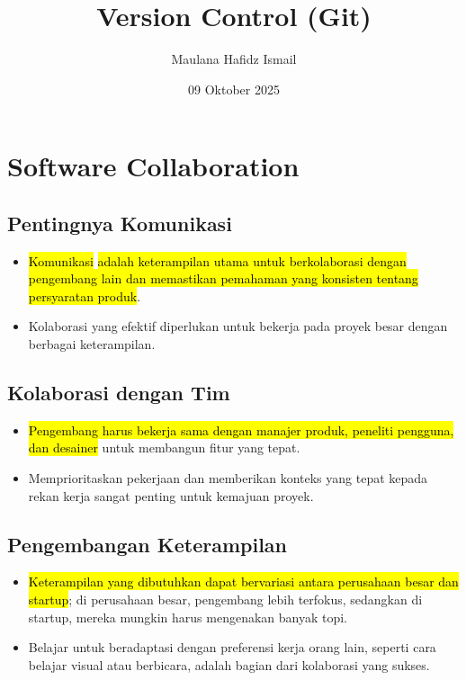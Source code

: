 \documentclass{article}
\title{Version Control (Git)}
\date{09 Oktober 2025}
\author{Maulana Hafidz Ismail}
\newcommand{\hlblue}[1]{\sethlcolor{cyan!30}\hl{#1}\sethlcolor{red!30}}
\begin{document}
\maketitle
\newpage

\tableofcontents
\newpage
{}

\section{Software Collaboration}
\subsection{Pentingnya Komunikasi}
\begin{itemize}
    \item \hlblue{Komunikasi} \hl{adalah keterampilan utama untuk berkolaborasi dengan pengembang lain dan memastikan pemahaman yang konsisten tentang persyaratan produk}.
    \item Kolaborasi yang efektif diperlukan untuk bekerja pada proyek besar dengan berbagai keterampilan.
\end{itemize}

\subsection{Kolaborasi dengan Tim}
\begin{itemize}
    \item \hl{Pengembang harus bekerja sama dengan manajer produk, peneliti pengguna, dan desainer} untuk membangun fitur yang tepat.
    \item Memprioritaskan pekerjaan dan memberikan konteks yang tepat kepada rekan kerja sangat penting untuk kemajuan proyek.
\end{itemize}

\subsection{Pengembangan Keterampilan}
\begin{itemize}
    \item \hl{Keterampilan yang dibutuhkan dapat bervariasi antara perusahaan besar dan startup}; di perusahaan besar, pengembang lebih terfokus, sedangkan di startup, mereka mungkin harus mengenakan banyak topi.
    \item Belajar untuk beradaptasi dengan preferensi kerja orang lain, seperti cara belajar visual atau berbicara, adalah bagian dari kolaborasi yang sukses.
\end{itemize}
\end{document}
